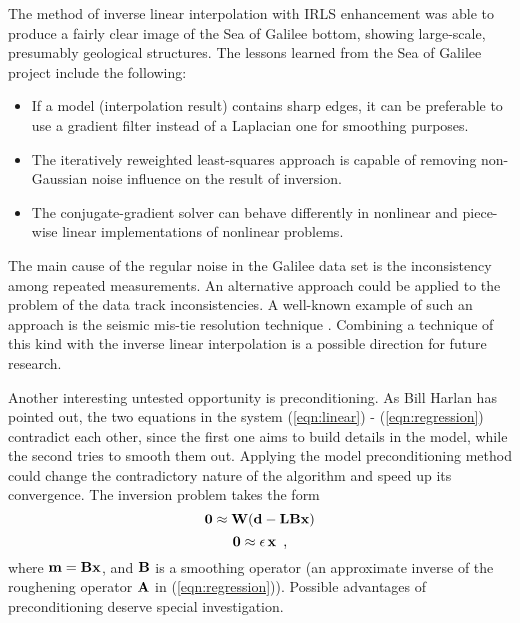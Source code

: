 The method of inverse linear interpolation with IRLS enhancement was able to
produce a fairly clear image of the Sea of Galilee bottom, showing large-scale,
presumably geological structures. The lessons learned from the
Sea of Galilee project include the following:
\begin{itemize} 
\item If a model (interpolation result) contains sharp edges, it can
be preferable to use a gradient filter instead of a Laplacian one for
smoothing purposes. 
\item The iteratively
reweighted least-squares approach is capable of removing non-Gaussian noise
influence on the result of inversion. 
\item The conjugate-gradient solver can behave differently in nonlinear and piece-wise linear implementations of nonlinear problems.
\end{itemize} 
\par
The main cause of the regular noise in the Galilee data set is
the inconsistency among repeated measurements. An
alternative approach could be applied to the problem
of the data track inconsistencies. A well-known
example of such an approach is the seismic mis-tie resolution
technique \cite{GEO.56.11.18251830}. Combining a technique of this
kind with the
inverse  linear interpolation is a possible direction for 
future research.  
\par
Another interesting
untested opportunity is preconditioning. As Bill Harlan has pointed out, 
the two equations in the system (\ref{eqn:linear}) - (\ref{eqn:regression})
contradict each other,  
since the first one aims to build details in the model, while
the second tries to smooth them out. Applying the model
preconditioning method could change the contradictory 
nature of the algorithm and speed up its convergence. 
The inversion problem takes the form
\begin{equation} {\bf 0 \approx W (d - LBx)} \label{eqn:precon}
\end{equation}
\begin{equation} {\bf 0 \approx \epsilon \, x} \,\,\,,\label{eqn:nograd} 
\end{equation}
where ${\bf m=Bx}$, and ${\bf B}$ is a smoothing operator (an approximate
inverse of the  roughening operator ${\bf A}$ in (\ref{eqn:regression})). 
Possible advantages of preconditioning 
deserve special investigation.












